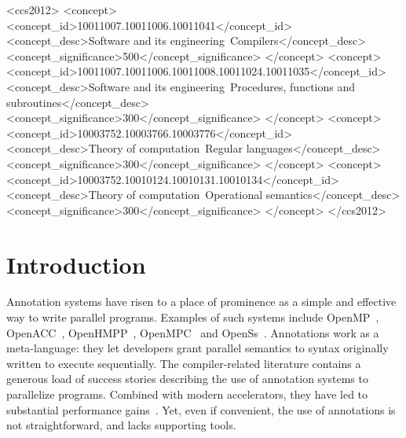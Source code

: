 \documentclass[sigplan,10pt,review,anonymous]{acmart}
\begin{document}
 \begin{CCSXML}
<ccs2012>
<concept>
<concept_id>10011007.10011006.10011041</concept_id>
<concept_desc>Software and its engineering~Compilers</concept_desc>
<concept_significance>500</concept_significance>
</concept>
<concept>
<concept_id>10011007.10011006.10011008.10011024.10011035</concept_id>
<concept_desc>Software and its engineering~Procedures, functions and subroutines</concept_desc>
<concept_significance>300</concept_significance>
</concept>
<concept>
<concept_id>10003752.10003766.10003776</concept_id>
<concept_desc>Theory of computation~Regular languages</concept_desc>
<concept_significance>300</concept_significance>
</concept>
<concept>
<concept_id>10003752.10010124.10010131.10010134</concept_id>
<concept_desc>Theory of computation~Operational semantics</concept_desc>
<concept_significance>300</concept_significance>
</concept>
</ccs2012>
\end{CCSXML}



\maketitle

\section{Introduction}
\label{sec:intro}

Annotation systems have risen to a place of prominence as a simple and
effective way to write parallel programs.
Examples of such systems include OpenMP~\cite{JaegerCP15},
OpenACC~\cite{OpenACC20}, OpenHMPP~\cite{Andion14}, OpenMPC~\cite{Lee10} and OpenSs~\cite{MeenderinckJ11}.
Annotations work as a meta-language: they let developers grant parallel
semantics to syntax originally written to execute sequentially.
The compiler-related literature contains a generous load of success stories
describing the use of annotation systems to parallelize programs.
Combined with modern accelerators, they have led to substantial performance
gains~\cite{Bertolli14,Mendonca17,Poesia17,Reyes12,Wienke12}.
Yet, even if convenient, the use of annotations is not straightforward, and
lacks supporting tools.
\end{document}
